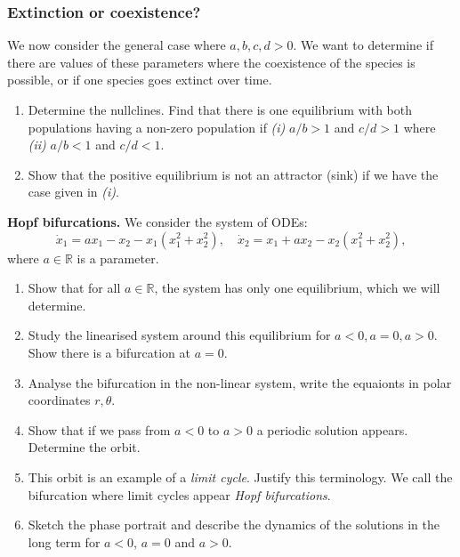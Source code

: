 \documentclass{article}
\begin{document}
\begin{question}
  \subsubsection*{Extinction or coexistence?}
  We now consider the general case where $a,b,c,d>0$. We want to determine if there are values of these parameters where the coexistence of the species is possible, or if one species goes extinct over time.
  \begin{enumerate}[label=(\alph*),resume]
    \item Determine the nullclines. Find that there is one equilibrium with both populations having a non-zero population if \textit{(i)} $a/b>1$ and $c/d>1$ where \textit{(ii)} $a/b<1$ and $c/d<1$.
     \item Show that the positive equilibrium is not an attractor (sink) if we have the case given in \textit{(i)}.
  \end{enumerate}
    
\end{question}

\begin{question}
  \textbf{Hopf bifurcations.} We consider the system of ODEs:
  \begin{equation}
    \dot x_1 = a x_1 - x_2 -x_1(x_1^2+x_2^2),\quad \dot x_2 = x_1+ a x_2 -x_2(x_1^2+x_2^2),
  \end{equation}
  where $a \in \mathbb R$ is a parameter.
  \begin{enumerate}[label=(\alph*)]
    \item Show that for all $a\in \mathbb R$, the system has only one equilibrium, which we will determine.
    \item Study the linearised system around this equilibrium for $a<0,a=0,a>0$. Show there is a bifurcation at $a=0$.
    
    \item Analyse the bifurcation in the non-linear system, write the equaionts in polar coordinates $r,\theta$.
    
   \item Show that if we pass from $a<0$ to $a>0$ a periodic solution appears. Determine the orbit.
   
   \item This orbit is an example of a \textit{limit cycle}. Justify this terminology. We call the bifurcation where limit cycles appear \textit{Hopf bifurcations}.
   
   \item Sketch the phase portrait and describe the dynamics of the solutions in the long term for $a<0$, $a=0$ and $a>0$.
   \end{enumerate}
\end{question}
\end{document}
